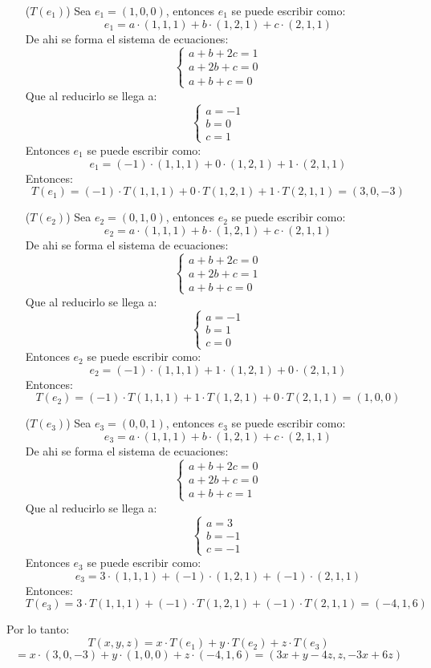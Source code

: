 \documentclass[a4paper,12pt]{article}
\begin{document}
\begin{itemize}
    \item[($T(e_1)$)] Sea $e_1=(1,0,0)$, entonces $e_1$ se puede escribir como:
    $$
        e_1 = a\cdot (1,1,1) + b\cdot (1,2,1) + c\cdot (2,1,1)
    $$
    De ahi se forma el sistema de ecuaciones:
    $$
    \begin{cases}
        a+b+2c=1 \\
        a+2b+c=0 \\
        a+b+c=0
    \end{cases}
    $$
    Que al reducirlo se llega a:
    $$
    \begin{cases}
        a=-1 \\
        b=0 \\
        c=1
    \end{cases}
    $$
    Entonces $e_1$ se puede escribir como:
    $$
        e_1 = (-1)\cdot (1,1,1) + 0\cdot (1,2,1) + 1\cdot (2,1,1)
    $$
    Entonces:
    $$
        T(e_1) = (-1)\cdot T(1,1,1) + 0\cdot T(1,2,1) + 1\cdot T(2,1,1) = (3,0,-3)
    $$
    \item[($T(e_2)$)] Sea $e_2=(0,1,0)$, entonces $e_2$ se puede escribir como:
    $$
        e_2 = a\cdot (1,1,1) + b\cdot (1,2,1) + c\cdot (2,1,1)
    $$
    De ahi se forma el sistema de ecuaciones:
    $$
    \begin{cases}
        a+b+2c=0 \\
        a+2b+c=1 \\
        a+b+c=0
    \end{cases}
    $$
    Que al reducirlo se llega a:
    $$
    \begin{cases}
        a=-1 \\
        b=1 \\
        c=0
    \end{cases}
    $$
    Entonces $e_2$ se puede escribir como:
    $$
        e_2 = (-1)\cdot (1,1,1) + 1\cdot (1,2,1) + 0\cdot (2,1,1)
    $$
    Entonces:
    $$
        T(e_2) = (-1)\cdot T(1,1,1) + 1\cdot T(1,2,1) + 0\cdot T(2,1,1) = (1,0,0)
    $$
    \item[($T(e_3)$)]
    Sea $e_3=(0,0,1)$, entonces $e_3$ se puede escribir como:
    $$
        e_3 = a\cdot (1,1,1) + b\cdot (1,2,1) + c\cdot (2,1,1)
    $$
    De ahi se forma el sistema de ecuaciones:
    $$
    \begin{cases}
        a+b+2c=0 \\
        a+2b+c=0 \\
        a+b+c=1
    \end{cases}
    $$
    Que al reducirlo se llega a:
    $$
    \begin{cases}
        a=3 \\
        b=-1 \\
        c=-1
    \end{cases}
    $$
    Entonces $e_3$ se puede escribir como:
    $$
        e_3 = 3\cdot (1,1,1) + (-1)\cdot (1,2,1) + (-1)\cdot (2,1,1)
    $$
    Entonces:
    $$
        T(e_3) = 3\cdot T(1,1,1) + (-1)\cdot T(1,2,1) + (-1)\cdot T(2,1,1) = (-4,1,6)
    $$
\end{itemize}
Por lo tanto:
$$
T(x,y,z)= x\cdot T(e_1) + y\cdot T(e_2) + z\cdot T(e_3)
$$
$$
= x\cdot (3,0,-3) + y\cdot (1,0,0) + z\cdot (-4,1,6) = (3x+y-4z,z,-3x+6z)
$$  
\end{document}
